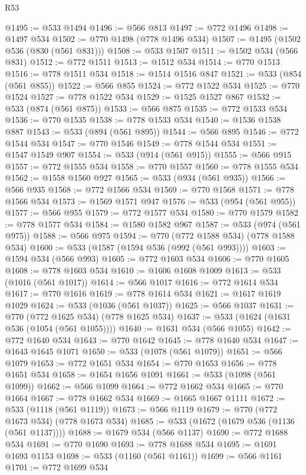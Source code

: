 \begin{lexlean}{R53}
\begin{coremodule}
@1495 := @533 @1494
@1496 := @566 @813
@1497 := @772 @1496
@1498 := @1497 @534
@1502 := @770 @1498 (@778 @1496 @534)
@1507 := @1495 (@1502 @536 (@830 (@561 @831)))
@1508 := @533 @1507
@1511 := @1502 @534 (@566 @831)
@1512 := @772 @1511
@1513 := @1512 @534
@1514 := @770 @1513
@1516 := @778 @1511 @534
@1518 := @1514 @1516 @847
@1521 := @533 (@854 (@561 @855))
@1522 := @566 @855
@1524 := @772 @1522 @534
@1525 := @770 @1524
@1527 := @778 @1522 @534
@1529 := @1525 @1527 @867
@1532 := @533 (@874 (@561 @875))
@1533 := @566 @875
@1535 := @772 @1533 @534
@1536 := @770 @1535
@1538 := @778 @1533 @534
@1540 := @1536 @1538 @887
@1543 := @533 (@894 (@561 @895))
@1544 := @566 @895
@1546 := @772 @1544 @534
@1547 := @770 @1546
@1549 := @778 @1544 @534
@1551 := @1547 @1549 @907
@1554 := @533 (@914 (@561 @915))
@1555 := @566 @915
@1557 := @772 @1555 @534
@1558 := @770 @1557
@1560 := @778 @1555 @534
@1562 := @1558 @1560 @927
@1565 := @533 (@934 (@561 @935))
@1566 := @566 @935
@1568 := @772 @1566 @534
@1569 := @770 @1568
@1571 := @778 @1566 @534
@1573 := @1569 @1571 @947
@1576 := @533 (@954 (@561 @955))
@1577 := @566 @955
@1579 := @772 @1577 @534
@1580 := @770 @1579
@1582 := @778 @1577 @534
@1584 := @1580 @1582 @967
@1587 := @533 (@974 (@561 @975))
@1588 := @566 @975
@1594 := @770 (@772 @1588 @534) (@778 @1588 @534)
@1600 := @533 (@1587 (@1594 @536 (@992 (@561 @993))))
@1603 := @1594 @534 (@566 @993)
@1605 := @772 @1603 @534
@1606 := @770 @1605
@1608 := @778 @1603 @534
@1610 := @1606 @1608 @1009
@1613 := @533 (@1016 (@561 @1017))
@1614 := @566 @1017
@1616 := @772 @1614 @534
@1617 := @770 @1616
@1619 := @778 @1614 @534
@1621 := @1617 @1619 @1029
@1624 := @533 (@1036 (@561 @1037))
@1625 := @566 @1037
@1631 := @770 (@772 @1625 @534) (@778 @1625 @534)
@1637 := @533 (@1624 (@1631 @536 (@1054 (@561 @1055))))
@1640 := @1631 @534 (@566 @1055)
@1642 := @772 @1640 @534
@1643 := @770 @1642
@1645 := @778 @1640 @534
@1647 := @1643 @1645 @1071
@1650 := @533 (@1078 (@561 @1079))
@1651 := @566 @1079
@1653 := @772 @1651 @534
@1654 := @770 @1653
@1656 := @778 @1651 @534
@1658 := @1654 @1656 @1091
@1661 := @533 (@1098 (@561 @1099))
@1662 := @566 @1099
@1664 := @772 @1662 @534
@1665 := @770 @1664
@1667 := @778 @1662 @534
@1669 := @1665 @1667 @1111
@1672 := @533 (@1118 (@561 @1119))
@1673 := @566 @1119
@1679 := @770 (@772 @1673 @534) (@778 @1673 @534)
@1685 := @533 (@1672 (@1679 @536 (@1136 (@561 @1137))))
@1688 := @1679 @534 (@566 @1137)
@1690 := @772 @1688 @534
@1691 := @770 @1690
@1693 := @778 @1688 @534
@1695 := @1691 @1693 @1153
@1698 := @533 (@1160 (@561 @1161))
@1699 := @566 @1161
@1701 := @772 @1699 @534

\end{coremodule}
\end{lexlean}
